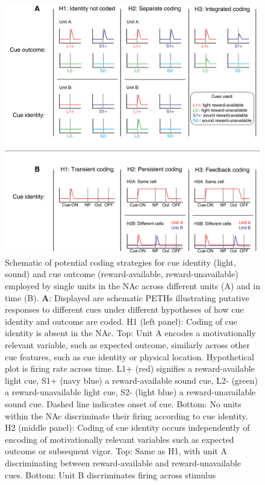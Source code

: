 \documentclass[11pt]{article}
\newcommand{\bsf}[1]{\textbf{#1}}
\begin{document}
\begin{figure}
[h]
\centering
\includegraphics[height=0.5\textheight]{Fig 1 - Schematic neural.png}
\caption{Schematic of potential coding strategies for cue identity
  (light, sound) and cue outcome (reward-available,
  reward-unavailable) employed by single units in the NAc across
  different units (A) and in time (B). \bsf{A}: Displayed are
  schematic PETHs illustrating putative responses to different cues
  under different hypotheses of how cue identity and outcome are
  coded. H1 (left panel): Coding of cue identity is absent in the
  NAc. Top: Unit A encodes a motivationally relevant variable, such as
  expected outcome, similarly across other cue features, such as cue
  identity or physical location. Hypothetical plot is firing rate
  across time. L1+ (red) signifies a reward-available light cue, S1+
  (navy blue) a reward-available sound cue, L2- (green) a
  reward-unavailable light cue, S2- (light blue) a reward-unavailable
  sound cue. Dashed line indicates onset of cue. Bottom: No units
  within the NAc discriminate their firing according to cue
  identity. H2 (middle panel): Coding of cue identity occurs
  independently of encoding of motivationally relevant variables such
  as expected outcome or subsequent vigor. Top: Same as H1, with unit
  A discriminating between reward-available and reward-unavailable
  cues. Bottom: Unit B discriminates firing across stimulus
}
\end{figure}
\end{document}
